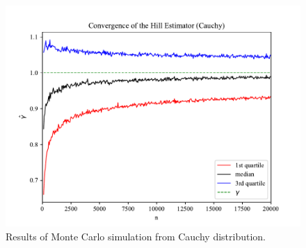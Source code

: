 \documentclass[english,12pt,a4paper,pdftex,sci,utf8]{aaltothesis} %
\begin{document}
\begin{figure}[H]
\begin{center}
\includegraphics[width=\textwidth]{cauchy.pdf}
\caption{Results of Monte Carlo simulation from Cauchy  distribution.}
\label{cauchy}
\end{center}
\end{figure}
\end{document}
